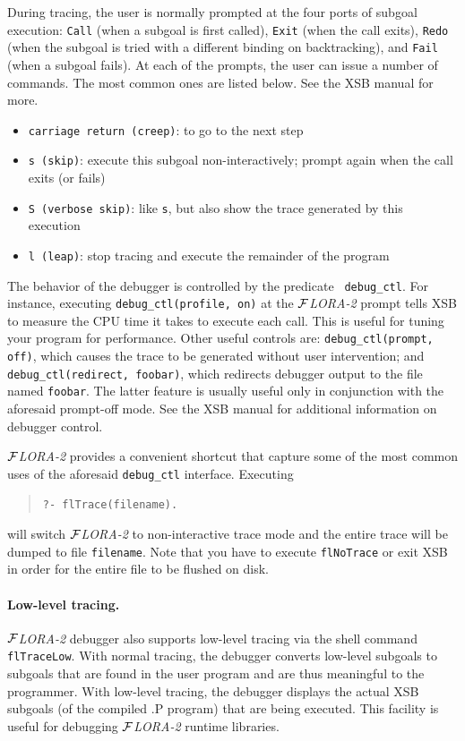 \documentclass[11pt]{article}
\newcommand{\FLORA}{{\mbox{${\cal F}${\small\it LORA}\rm\emph{-2}}}\xspace}
\begin{document}
During tracing, the user is normally prompted at the four ports of subgoal
execution: {\tt Call} (when a subgoal is first called), {\tt Exit} (when
the call exits), {\tt Redo} (when the subgoal is tried with a different
binding on backtracking), and {\tt Fail} (when a subgoal fails).
At each of the prompts, the user can issue a number of commands. The most
common ones are listed below. See the XSB manual for more.
\begin{itemize}
  \item {\tt carriage return (creep)}:  to go to the next step  
  \item {\tt s (skip)}: execute this subgoal non-interactively; prompt
    again when the call exits (or fails)
  \item {\tt S (verbose skip)}: like {\tt s}, but also show the trace
    generated by this execution
  \item {\tt l (leap)}: stop tracing and execute the remainder of the
    program
\end{itemize}
The behavior of the debugger is controlled by the predicate {\tt
  debug\_ctl}. For instance, executing {\tt debug\_ctl(profile, on)} at the
\FLORA prompt tells XSB to measure the CPU time it takes to execute each
call. This is useful for tuning your program for performance. Other useful
controls are: {\tt debug\_ctl(prompt, off)}, which causes the trace to be
generated without user intervention; and {\tt debug\_ctl(redirect,
  foobar)}, which redirects debugger output to the file named {\tt foobar}.
The latter feature is usually useful only in conjunction with the aforesaid
prompt-off mode. See the XSB manual for additional information on debugger
control.

\FLORA provides a convenient shortcut that capture some of the most common
uses of the aforesaid {\tt debug\_ctl} interface. Executing
\begin{quote}
  {\tt ?- flTrace(filename).}
\end{quote}
will switch \FLORA to non-interactive trace mode
and the entire trace will be dumped to file {\tt filename}.
Note that you have to execute {\tt flNoTrace} or exit XSB in order for the
entire file to be flushed on disk.

\paragraph{Low-level tracing.}
\FLORA debugger also supports low-level tracing via the shell command {\tt
  flTraceLow}. With normal tracing, the debugger converts low-level
subgoals to subgoals that are found in the user program and are thus
meaningful to the programmer. With low-level tracing, the debugger displays
the actual XSB subgoals (of the compiled .P program) that are being
executed. This facility is useful for debugging \FLORA runtime libraries.
\end{document}
